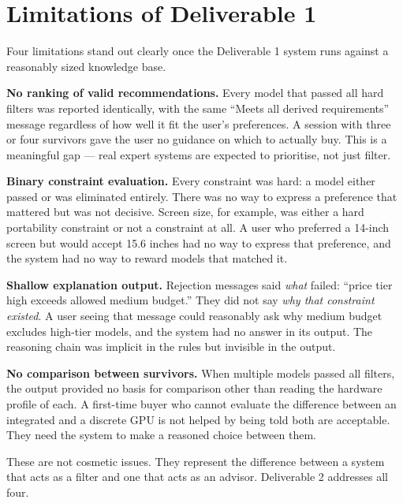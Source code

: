 \documentclass[12pt,a4paper]{article}
\begin{document}
\section{Limitations of Deliverable 1}
\label{sec:limitations-d1}

Four limitations stand out clearly once the Deliverable 1 system runs against a reasonably sized knowledge base.

\textbf{No ranking of valid recommendations.} Every model that passed all hard filters was reported identically, with the same ``Meets all derived requirements'' message regardless of how well it fit the user's preferences. A session with three or four survivors gave the user no guidance on which to actually buy. This is a meaningful gap --- real expert systems are expected to prioritise, not just filter.

\textbf{Binary constraint evaluation.} Every constraint was hard: a model either passed or was eliminated entirely. There was no way to express a preference that mattered but was not decisive. Screen size, for example, was either a hard portability constraint or not a constraint at all. A user who preferred a 14-inch screen but would accept 15.6 inches had no way to express that preference, and the system had no way to reward models that matched it.

\textbf{Shallow explanation output.} Rejection messages said \emph{what} failed: ``price tier high exceeds allowed medium budget.'' They did not say \emph{why that constraint existed}. A user seeing that message could reasonably ask why medium budget excludes high-tier models, and the system had no answer in its output. The reasoning chain was implicit in the rules but invisible in the output.

\textbf{No comparison between survivors.} When multiple models passed all filters, the output provided no basis for comparison other than reading the hardware profile of each. A first-time buyer who cannot evaluate the difference between an integrated and a discrete GPU is not helped by being told both are acceptable. They need the system to make a reasoned choice between them.

These are not cosmetic issues. They represent the difference between a system that acts as a filter and one that acts as an advisor. Deliverable 2 addresses all four.

\end{document}
